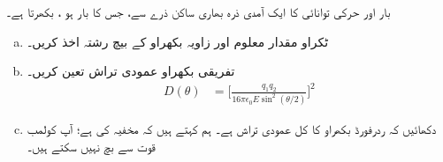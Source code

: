  بار  اور حرکی توانائی  کا ایک آمدی ذرہ  بھاری ساکن ذرے سے،  جس کا بار  ہو ،  بکھرتا ہے۔
\begin{enumerate}[a.]
\item
ٹکراو مقدار معلوم اور زاویہ بکھراو کے بیچ رشتہ اخذ کریں۔

 
\item
 تفریقی بکھراو عمودی تراش تعین کریں۔ 
\begin{align}
D(\theta)&=\big[\frac{q_1q_2}{16\pi\epsilon_0E\sin^2(\theta/2)}\big]^2
\end{align}
\item
 دکھائیں کہ ردرفورڈ بکھراو کا کل عمودی تراش   ہے۔ ہم کہتے ہیں کہ   مخفیہ کی     ہے؛  آپ کولمب قوت سے بچ نہیں سکتے ہیں۔
 \end{enumerate}


